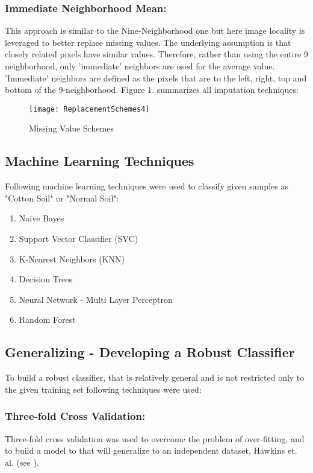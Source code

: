 \documentclass{llncs}
\begin{document}
\subsubsection{Immediate Neighborhood Mean:}
%
This approach is similar to the Nine-Neighborhood one but here image locality is leveraged to better replace missing values. The underlying assumption is that closely related pixels have similar values. Therefore, rather than using the entire 9 neighborhood, only 'immediate' neighbors are used for the average value. 'Immediate' neighbors are defined as the pixels that are to the left, right, top and bottom of the 9-neighborhood. 
%
Figure 1. summarizes all imputation techniques:

\begin{figure}
     \centering
    \texttt{[image: ReplacementSchemes4]}
    \caption{Missing Value Schemes}
    \label{fig:my_label}
\end{figure}

\subsection{Machine Learning Techniques}
Following machine learning techniques were used to classify given samples as "Cotton Soil" or "Normal Soil":
\begin{enumerate}
   \item Naive Bayes
   \item Support Vector Classifier (SVC)
   \item K-Nearest Neighbors (KNN)
   \item Decision Trees
   \item Neural Network - Multi Layer Perceptron
   \item Random Forest
 \end{enumerate}
 
\subsection{Generalizing - Developing a Robust Classifier}
To build a robust classifier, that is relatively general and is not restricted only to the given training set following techniques were used:

\subsubsection{Three-fold Cross Validation:} Three-fold cross validation was used to overcome the problem of over-fitting, and to build a model to that will generalize to an independent dataset, Hawkins et. al. (see \cite{hawkins:eke}).  
\end{document}
